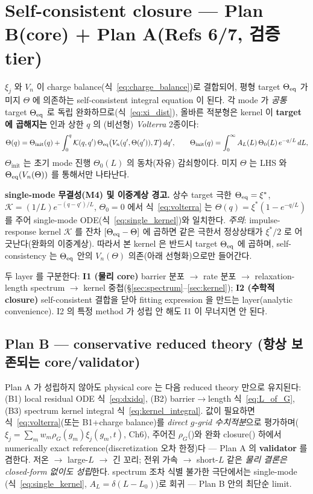 \section{Self-consistent closure — Plan B(core) + Plan A(Refs 6/7, 검증 tier)}\label{sec:closure}
$\xi_j$ 와 $V_n$ 이 charge balance(식~\eqref{eq:charge_balance})로 결합되어, 평형 target $\Theta_{\mathrm{eq}}$ 가
미지 $\Theta$ 에 의존하는 self-consistent integral equation 이 된다. 각 mode 가 \emph{공통} target
$\Theta_{\mathrm{eq}}$ 로 독립 완화하므로(식~\eqref{eq:xi_dist}), 올바른 적분형은 kernel 이 \textbf{target 에
곱해지는} 인과 상한 $q$ 의 (비선형) \emph{Volterra} 2종이다:
\begin{equation}
\Theta(q)=\Theta_\mathrm{init}(q)+\int_0^q \mathcal K(q,q')\,\Theta_{\mathrm{eq}}\big(V_n(q',\Theta(q')),T\big)\,dq',
\qquad \Theta_\mathrm{init}(q)=\int_0^\infty A_L(L)\,\Theta_0(L)\,e^{-q/L}\,dL,
\label{eq:volterra}
\end{equation}
$\Theta_\mathrm{init}$ 는 초기 mode 진행 $\Theta_0(L)$ 의 동차(자유) 감쇠항이다. 미지 $\Theta$ 는 LHS 와
$\Theta_{\mathrm{eq}}(V_n(\Theta))$ 를 통해서만 나타난다.
\begin{boundbox}
\textbf{single-mode 무결성(M4) 및 이중계상 경고.} 상수 target 극한 $\Theta_{\mathrm{eq}}=\xi^\ast$,
$\mathcal K=(1/L)e^{-(q-q')/L}$, $\Theta_0=0$ 에서 식~\eqref{eq:volterra} 는
$\Theta(q)=\xi^\ast(1-e^{-q/L})$ 를 주어 single-mode ODE(식~\eqref{eq:single_kernel})와 일치한다.
\emph{주의}: impulse-response kernel $\mathcal K$ 를 잔차 $[\Theta_{\mathrm{eq}}-\Theta]$ 에 곱하면 같은 극한서
정상상태가 $\xi^\ast/2$ 로 어긋난다(완화의 이중계상). 따라서 본 kernel 은 반드시 target $\Theta_{\mathrm{eq}}$ 에
곱하며, self-consistency 는 $\Theta_{\mathrm{eq}}$ 안의 $V_n(\Theta)$ 의존(아래 선형화)으로만 들어간다.
\end{boundbox}
두 layer 를 구분한다: \textbf{I1 (물리 core)} barrier 분포 $\to$ rate 분포 $\to$ relaxation-length
spectrum $\to$ kernel 중첩(\S\ref{sec:spectrum}--\ref{sec:kernel}); \textbf{I2 (수학적 closure)}
self-consistent 결합을 닫아 fitting expression 을 만드는 layer(analytic convenience). I2 의 특정 method 가
성립 안 해도 I1 이 무너지면 안 된다.

\subsection{Plan B — conservative reduced theory (항상 보존되는 core/validator)}\label{sec:planB}
Plan A 가 성립하지 않아도 physical core 는 다음 reduced theory 만으로 유지된다: (B1) local residual
ODE 식~\eqref{eq:dxidq}, (B2) barrier$\to$length 식~\eqref{eq:L_of_G}, (B3) spectrum kernel integral
식~\eqref{eq:kernel_integral}. 값이 필요하면 식~\eqref{eq:volterra}(또는 B1+charge balance)를
\emph{direct $g$-grid 수치적분}으로 평가하며($\xi_j=\sum_m w_m\rho_G(g_m)\xi_j(g_m,t)$, Ch6), 주어진
$\rho_G$()와 완화 closure() 하에서 numerically exact reference(discretization 오차 한정)다 —
Plan A 의 \textbf{validator} 를 겸한다. 저온 $\to$ large-$L$ $\to$ 긴 꼬리; 전위 가속 $\to$ short-$L$
같은 \emph{물리 결론은 closed-form 없이도 성립}한다. spectrum 조차 식별 불가한 극단에서는 single-mode
(식~\eqref{eq:single_kernel}, $A_L=\delta(L-L_0)$)로 회귀 — Plan B 안의 최단순 limit.

